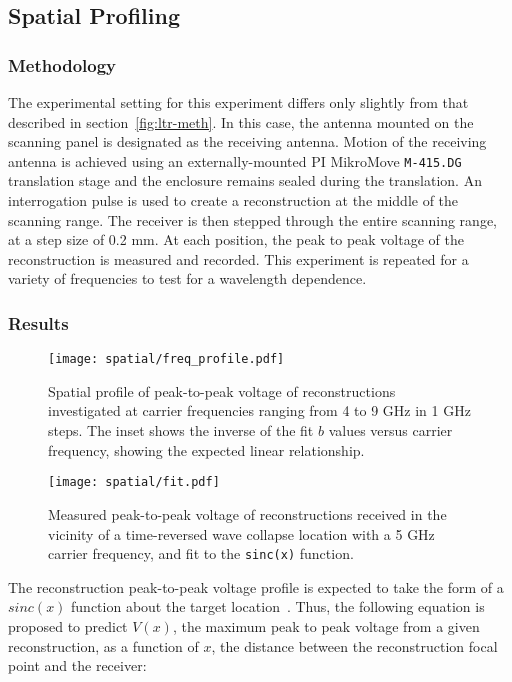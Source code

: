 \subsection{Spatial Profiling}
\label{sec:spatial-profile}
\subsubsection{Methodology}
The experimental setting for this experiment differs only slightly from that described in section~\ref{fig:ltr-meth}. In this case, the antenna mounted on the scanning panel is designated as the receiving antenna. Motion of the receiving antenna is achieved using an externally-mounted PI MikroMove \texttt{M-415.DG} translation stage and the enclosure remains sealed during the translation. An interrogation pulse is used to create a reconstruction at the middle of the scanning range. The receiver is then stepped through the entire scanning range, at a step size of 0.2 mm. At each position, the peak to peak voltage of the reconstruction is measured and recorded. This experiment is repeated for a variety of frequencies to test for a wavelength dependence.

\subsubsection{Results}
\label{sec:profile-results}

\begin{figure}[t!]
\texttt{[image: spatial/freq\_profile.pdf]}
\caption[Spatial profile of reconstruction at various frequencies]{Spatial profile of peak-to-peak voltage of reconstructions investigated at carrier frequencies ranging from 4 to 9 GHz in 1 GHz
steps.  The inset shows the inverse of the fit $b$ values versus carrier frequency, showing the expected linear relationship.}
\label{fig:spatial-freq-profile}
\end{figure}

\begin{figure}[t!]
\texttt{[image: spatial/fit.pdf]}
\caption[Fit of spatial profile]{Measured peak-to-peak voltage of reconstructions received in the
vicinity of a time-reversed wave collapse location with a 5 GHz carrier
frequency, and fit to the \texttt{sinc(x)} function.}
\label{fig:spatial-error-fit}
\end{figure}

The reconstruction peak-to-peak voltage profile is expected to take the form of a $sinc(x)$ function about the target location~\cite{lerosey-focusing}. Thus, the following equation is proposed to predict $V(x)$, the maximum peak to peak voltage from a given reconstruction, as a function of $x$, the distance between the reconstruction focal point and the receiver:

